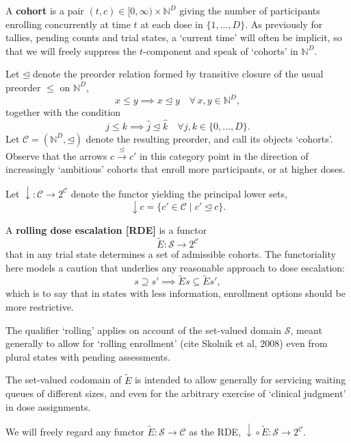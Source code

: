 \documentclass{article}
\newcommand{\N}{\mathbb{N}}
\renewcommand{\S}{\ensuremath{\mathcal{S}}} %
\newcommand{\C}{\ensuremath{\mathcal{C}}}
\begin{document}
\begin{defn}
  A \textbf{cohort} is a pair $(t,c) \in [0,\infty) \times \N^D$ giving the number of participants enrolling concurrently at time $t$ at each dose in $\{1,...,D\}$.  As previously for tallies, pending counts and trial states, a `current time' will often be implicit, so that we will freely suppress the $t$-component and speak of `cohorts' in $\N^D$.
\end{defn}

\begin{defn}\label{cohcat}
  Let $\unlhd$ denote the preorder relation formed by transitive closure of the usual preorder $\le$ on $\N^D$,
  $$
  x \le y \implies x \unlhd y \quad\forall\, x, y \in \N^D,
  $$
  together with the condition
  $$
  j \le k \implies \widehat{j} \unlhd \widehat{k} \quad\forall j,k \in \{0,...,D\}.
  $$
  Let $\C = (\N^D,\unlhd)$ denote the resulting preorder, and call its objects `cohorts'.  Observe that the arrows $c \xrightarrow{\unlhd} c'$ in this category point in the direction of increasingly `ambitious' cohorts that enroll more participants, or at higher doses.
\end{defn}

\begin{nota}
  Let $\downarrow : \C \rightarrow 2^\C$ denote the functor yielding the principal lower sets,
  $$
  \downarrow c = \{ c' \in \C \mid c' \unlhd c \}.
  $$
\end{nota}

\begin{defn}\label{deprot}
  A \textbf{rolling dose escalation [RDE]} is a functor
  $$
  \widetilde{E} : \S \rightarrow 2^\C
  $$
  that in any trial state determines a set of admissible cohorts.  The functoriality here models a caution that underlies any reasonable approach to dose escalation:
  $$
  s \supseteq s' \implies \widetilde{E} s \subseteq \widetilde{E} s',
  $$
  which is to say that in states with less information, enrollment options should be more restrictive.

  The qualifier `rolling' applies on account of the set-valued domain $\S$, meant generally to allow for `rolling enrollment' (cite Skolnik et al, 2008) even from plural states with pending assessments.
  
  The set-valued codomain of $\widetilde{E}$ is intended to allow generally for servicing waiting queues of different sizes, and even for the arbitrary exercise of `clinical judgment' in dose assignments.

  We will freely regard any functor $\widetilde{E} : \S \rightarrow \C$ as the RDE, $\downarrow\!\circ \widetilde{E} : \S \rightarrow 2^\C$.
\end{defn}
\end{document}
